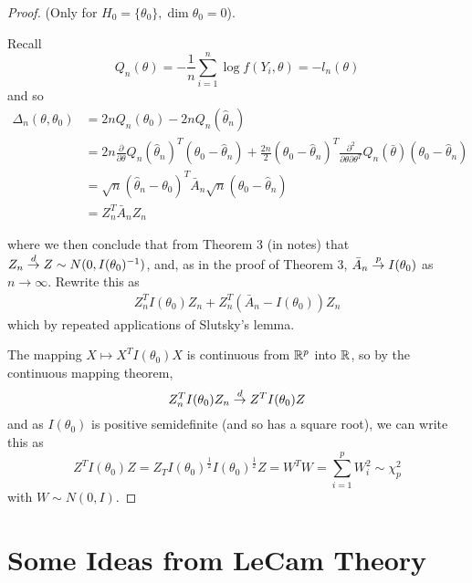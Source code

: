 \begin{proof}
  (Only for $H_{0} = \{ \theta_{0} \}, \dim \theta_{0} = 0$).

  Recall
  \begin{equation}
    \label{eq:77}
    Q_{n}(\theta) = - \frac{1}{n} \sum_{i=1}^{n} \log f(Y_{i}, \theta)
    = -l_{n}(\theta)
  \end{equation} and so
  \begin{align}
    \label{eq:80}
    \Delta_{n}(\theta, \theta_{0}) &= 2n Q_{n}(\theta_{0}) - 2n Q_{n}(\hat \theta_{n}) \\
    &= 2n \frac{\partial}{\partial \theta} Q_{n} (\hat
    \theta_{n})^{T}(\theta_{0} - \hat \theta_{n}) +
    \frac{2n}{2}(\theta_{0} - \hat \theta_{n})^{T}
    \frac{\partial^{2}}{\partial \theta \partial \theta^{T}}Q_{n}(\bar
    \theta)(\theta_{0} - \hat \theta_{n}) \\
    &= \sqrt{n} (\hat \theta_{n} - \theta_{0})^{T} \bar A_{n} \sqrt{n}
    (\theta_{0} - \hat \theta_{n}) \\
    &= Z_{n}^{T} \bar A_{n} Z_{n}
  \end{align}

  where we then conclude that from Theorem 3 (in notes) that $Z_{n}
  \overset{d}{\rightarrow} Z \sim N(0, I(\theta_{0})^{-1})$, and, as in the proof of
  Theorem 3, $\bar A_{n} \overset{p}{\rightarrow} I(\theta_{0})$ as $n \rightarrow \infty$.
  Rewrite this as
  \begin{align}
    \label{eq:81}
    Z_{n}^{T} I(\theta_{0})Z_{n} + Z_{n}^{T}(\bar A_{n} -
    I(\theta_{0})) Z_{n}
  \end{align} which by repeated applications of Slutsky's lemma.

  The mapping $X \mapsto X^{T} I(\theta_{0})X$ is continuous from
  $\mathbb{R}^{p}$ into $\mathbb{R}$, so by the continuous mapping theorem,
  \begin{equation}
    \label{eq:82}
    Z_{n}^{T} I(\theta_{0}) Z_{n} \overset{d}{\rightarrow} Z^{T}I(\theta_{0})Z
  \end{equation}
  and as $I(\theta_{0})$ is positive semidefinite (and so has a square
  root), we can write this as
  \begin{equation}
    \label{eq:83}
    Z^{T} I(\theta_{0}) Z = Z_{T} I(\theta_{0})^{\frac{1}{2}}
    I(\theta_{0})^{\frac{1}{2}}Z = W^{T} W = \sum_{i=1}^{p} W_{i}^{2}
    \sim \chi^{2}_{p}
  \end{equation} with $W \sim N(0, I)$.
\end{proof}

\section{Some Ideas from LeCam Theory}
\label{sec:some-ideas-from}

